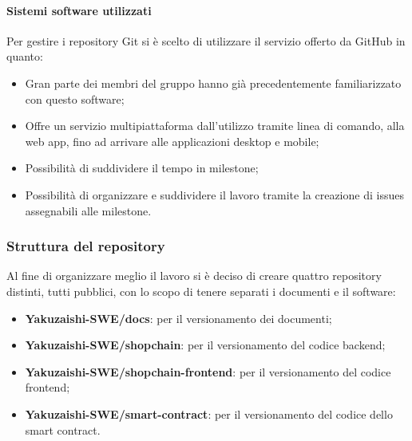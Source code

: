 \paragraph{Sistemi software utilizzati}
Per gestire i repository\glo{} Git\glo{} si è scelto di utilizzare il servizio offerto da GitHub\glo{} in quanto:
\begin{itemize}
    \item Gran parte dei membri del gruppo hanno già precedentemente familiarizzato con questo software;
    \item Offre un servizio multipiattaforma dall'utilizzo tramite linea di comando, alla web app\glo{}, fino ad arrivare alle applicazioni desktop e mobile;
    \item Possibilità di suddividere il tempo in milestone\glo{};
    \item Possibilità di organizzare e suddividere il lavoro tramite la creazione di issues\glo{} assegnabili alle milestone\glo{}.
\end{itemize}


\subsubsection{Struttura del repository}\label{paragraph: repository}
Al fine di organizzare meglio il lavoro si è deciso di creare quattro repository\glo{} distinti, tutti pubblici, con lo scopo di tenere separati i documenti e il software:
\begin{itemize}
    \item \textbf{Yakuzaishi-SWE/docs}: per il versionamento dei documenti;
    \item \textbf{Yakuzaishi-SWE/shopchain}: per il versionamento del codice backend\glo{};
    \item \textbf{Yakuzaishi-SWE/shopchain-frontend}: per il versionamento del codice frontend\glo{};
    \item \textbf{Yakuzaishi-SWE/smart-contract}: per il versionamento del codice dello smart contract\glo{}.

\end{itemize}

